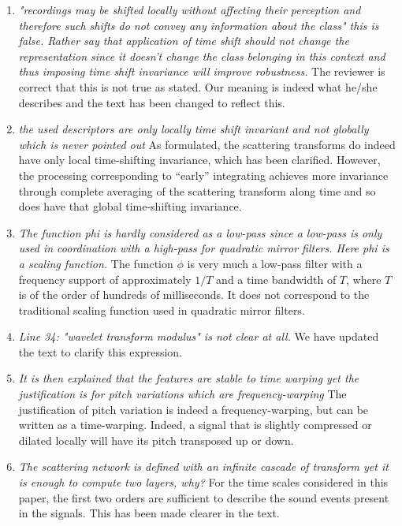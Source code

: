 \documentclass[10pt]{article}
\begin{document}
\begin{enumerate}
\item \emph{"recordings may be shifted locally 
without affecting their perception and therefore such shifts do not convey any information about the class" this is false. Rather say that application of time shift should not change the representation since it doesn't change the class belonging in this context and thus imposing time shift invariance will improve robustness.}
The reviewer is correct that this is not true as stated. Our meaning is indeed what he/she describes and the text has been changed to reflect this.

\item \emph{the used descriptors are only locally time shift invariant and not globally which is never pointed out}
As formulated, the scattering transforms do indeed have only local time-shifting invariance, which has been clarified. However, the processing corresponding to ``early'' integrating achieves more invariance through complete averaging of the scattering transform along time and so does have that global time-shifting invariance.

\item \emph{The function phi is hardly considered as a low-pass since a low-pass is only used in coordination with a high-pass for quadratic mirror filters. Here phi is a scaling function.}
The function $\phi$ is very much a low-pass filter with a frequency support of approximately $1/T$ and a time bandwidth of $T$, where $T$ is of the order of hundreds of milliseconds. It does not correspond to the traditional scaling function used in quadratic mirror filters.

\item \emph{Line 34: "wavelet transform modulus" is not clear at all.}
We have updated the text to clarify this expression.

\item \emph{It is then explained that the features are stable to time warping yet the justification is for pitch variations which are frequency-warping}
The justification of pitch variation is indeed a frequency-warping, but can be written as a time-warping. Indeed, a signal that is slightly compressed or dilated locally will have its pitch transposed up or down.

\item \emph{The scattering network is defined with an infinite cascade of transform yet it is enough to compute two layers, why?}
For the time scales considered in this paper, the first two orders are sufficient to describe the sound events present in the signals. This has been made clearer in the text.


\end{enumerate}
\end{document}
